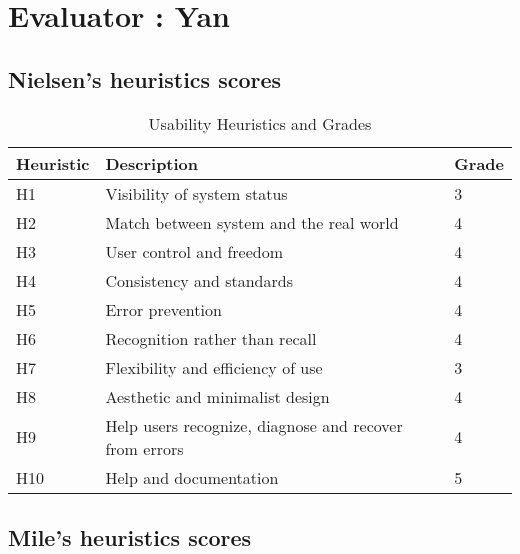 
\section{Evaluator : Yan} 
\subsection{Nielsen’s heuristics scores}
\begin{table}[h]
	\centering
	\caption{Usability Heuristics and Grades}
	\label{tab:usabilityHeuristicsGrades}
	\begin{tabular}{|l|l|l|}
		\hline
		\textbf{Heuristic} & \textbf{Description}                                & \textbf{Grade} \\ \hline
		H1                 & Visibility of system status                         & 3             \\ \hline
		H2                 & Match between system and the real world             & 4              \\ \hline
		H3                 & User control and freedom                            & 4              \\ \hline
		H4                 & Consistency and standards                           & 4              \\ \hline
		H5                 & Error prevention                                    & 4              \\ \hline
		H6                 & Recognition rather than recall                      & 4              \\ \hline
		H7                 & Flexibility and efficiency of use                   & 3              \\ \hline
		H8                 & Aesthetic and minimalist design                     & 4              \\ \hline
		H9                 & Help users recognize, diagnose and recover from errors & 4           \\ \hline
		H10                & Help and documentation                              & 5              \\ \hline
	\end{tabular}
\end{table}

\subsection{Mile’s heuristics scores}

